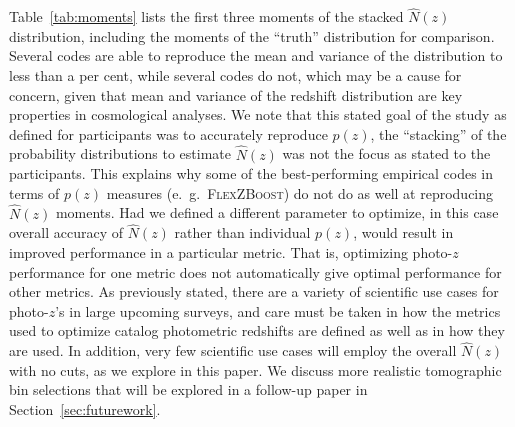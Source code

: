 Table~\ref{tab:moments} lists the first three moments of the stacked $\hat{N}(z)$ distribution, including the moments of the ``truth'' distribution for comparison.  Several codes are able to reproduce the mean and variance of the distribution to less than a per cent, while several codes do not, which may be a cause for concern, given that mean and variance of the redshift distribution are key properties in cosmological analyses.  We note that this stated goal of the study as defined for participants was to accurately reproduce $p(z)$, the ``stacking'' of the probability distributions to estimate $\hat{N}(z)$ was not the focus as stated to the participants.  This explains why some of the best-performing empirical codes in terms of $p(z)$ measures (e.~g.~\textsc{FlexZBoost}) do not do as well at reproducing $\hat{N}(z)$ moments.  Had we defined a different parameter to optimize, in this case overall accuracy of $\hat{N}(z)$ rather than individual $p(z)$, would result in improved performance in a particular metric.  That is, optimizing photo-$z$ performance for one metric does not automatically give optimal performance for other metrics.  As previously stated, there are a variety of scientific use cases for photo-$z$'s in large upcoming surveys, and care must be taken in how the metrics used to optimize catalog photometric redshifts are defined as well as in how they are used.  In addition, very few scientific use cases will employ the overall $\hat{N}(z)$ with no cuts, as we explore in this paper.  We discuss more realistic tomographic bin selections that will be explored in a follow-up paper in Section~\ref{sec:futurework}.





